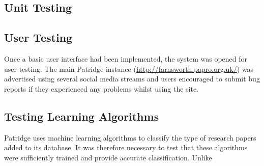 %  
%

\subsection{ Unit Testing }


\subsection{ User Testing } 

Once a basic user interface had been implemented, the system was opened for
user testing. The main Patridge instance
(\url{http://farnsworth.papro.org.uk/}) was advertised using several social
media streams and users encouraged to submit bug reports if they experienced
any problems whilst using the site.


\subsection{ Testing Learning Algorithms }

Patridge uses machine learning algorithms to classify the type of research
papers added to its database. It was therefore necessary to test that these
algorithms were sufficiently trained and provide accurate classification.
Unlike 
